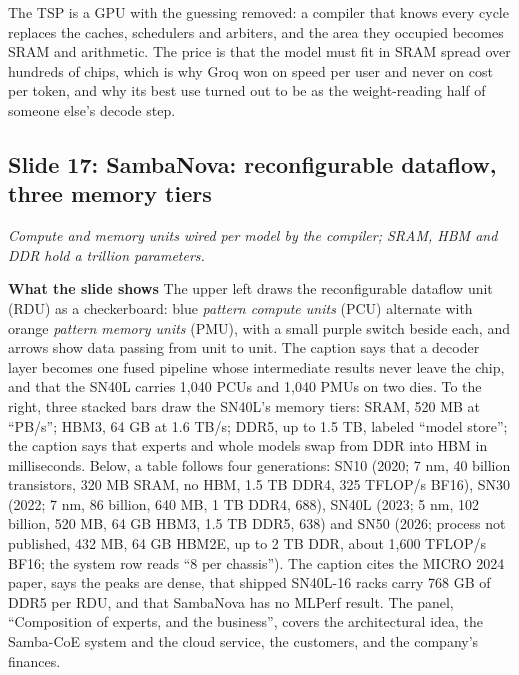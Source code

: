 \documentclass[11pt,letterpaper]{article}
\newcommand{\slide}[3]{%
  \subsection[Slide #1: #2]{Slide #1: #2}%
  {\color{muted}\itshape #3\par}\medskip}
\newcommand{\para}[1]{\medskip\noindent\textbf{#1}\quad}
\newenvironment{intuition}{\begin{tcolorbox}[intuitionbox]}{\end{tcolorbox}}
\begin{document}
\begin{intuition}
The TSP is a GPU with the guessing removed: a compiler that knows every cycle replaces the caches, schedulers and arbiters, and the area they occupied becomes SRAM and arithmetic. The price is that the model must fit in SRAM spread over hundreds of chips, which is why Groq won on speed per user and never on cost per token, and why its best use turned out to be as the weight-reading half of someone else's decode step.
\end{intuition}

\slide{17}{SambaNova: reconfigurable dataflow, three memory tiers}{Compute and memory units wired per model by the compiler; SRAM, HBM and DDR hold a trillion parameters.}

\para{What the slide shows} The upper left draws the reconfigurable dataflow unit (RDU) as a checkerboard: blue \emph{pattern compute units} (PCU) alternate with orange \emph{pattern memory units} (PMU), with a small purple switch beside each, and arrows show data passing from unit to unit. The caption says that a decoder layer becomes one fused pipeline whose intermediate results never leave the chip, and that the SN40L carries 1{,}040 PCUs and 1{,}040 PMUs on two dies. To the right, three stacked bars draw the SN40L's memory tiers: SRAM, 520 MB at ``PB/s''; HBM3, 64 GB at 1.6 TB/s; DDR5, up to 1.5 TB, labeled ``model store''; the caption says that experts and whole models swap from DDR into HBM in milliseconds. Below, a table follows four generations: SN10 (2020; 7 nm, 40 billion transistors, 320 MB SRAM, no HBM, 1.5 TB DDR4, 325 TFLOP/s BF16), SN30 (2022; 7 nm, 86 billion, 640 MB, 1 TB DDR4, 688), SN40L (2023; 5 nm, 102 billion, 520 MB, 64 GB HBM3, 1.5 TB DDR5, 638) and SN50 (2026; process not published, 432 MB, 64 GB HBM2E, up to 2 TB DDR, about 1{,}600 TFLOP/s BF16; the system row reads ``8 per chassis''). The caption cites the MICRO 2024 paper, says the peaks are dense, that shipped SN40L-16 racks carry 768 GB of DDR5 per RDU, and that SambaNova has no MLPerf result. The panel, ``Composition of experts, and the business'', covers the architectural idea, the Samba-CoE system and the cloud service, the customers, and the company's finances.
\end{document}
